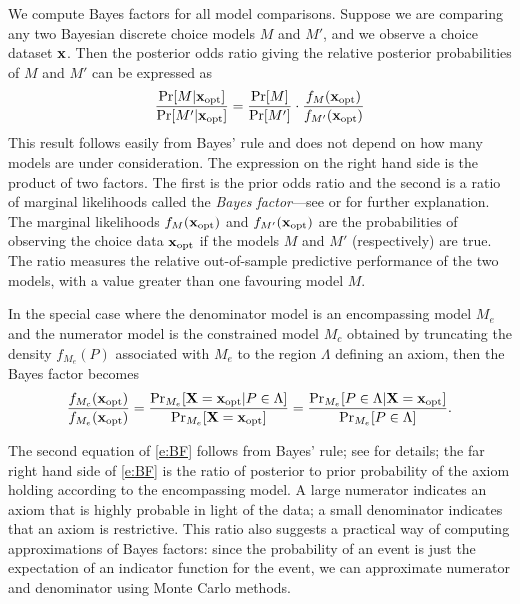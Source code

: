 \documentclass[11pt,letter]{article}
\begin{document}
We compute Bayes factors for all model comparisons.
Suppose we are comparing any two Bayesian discrete choice models $M$ and $M'$, and we observe a choice dataset ${\bf x}$.
Then the posterior odds ratio giving the relative posterior probabilities of $M$ and $M'$ can be expressed as
\[
  \frac{\Pr[M|{\bf x}_\mathrm{opt}]}{\Pr[M'|{\bf x}_\mathrm{opt}]} = \frac{\Pr[M]}{\Pr[M']}
  \cdot
  \frac{f_{M}({\bf x}_\mathrm{opt})}{f_{M'}({\bf x}_\mathrm{opt})}
\]
This result follows easily from Bayes' rule and does not depend on how many models are under consideration.
The expression on the right hand side is the product of two factors.
The first is the prior odds ratio and the second is a ratio of marginal likelihoods called the {\em Bayes factor}---see  or  for further explanation.
The marginal likelihoods $f_{M}({\bf x}_\mathrm{opt})$ and $f_{M'}({\bf x}_\mathrm{opt})$ are the probabilities of observing the choice data ${\bf x}_\mathrm{opt}$ if the models $M$ and $M'$ (respectively) are true.
The ratio measures the relative out-of-sample predictive performance of the two models, with a value greater t{}han one favouring model $M$.

In the special case where the denominator model is an encompassing model $M_e$ and the numerator model is the constrained model $M_c$ obtained by truncating the density $f_{M_e}(P)$ associated with $M_e$ to the region $\Lambda$ defining an axiom, then the Bayes factor becomes
\begin{equation}\label{e:BF}
  \frac{f_{M_c}({\bf x}_\mathrm{opt})}{f_{M_e}({\bf x}_\mathrm{opt})} =
  \frac{\Pr_{M_e}[{\bf X} = {\bf x}_\mathrm{opt}|P \in \Lambda]}{\Pr_{M_e}[{\bf X} = {\bf x}_\mathrm{opt}]} = \frac{\Pr_{M_e}[P \in \Lambda|{\bf X} = {\bf x}_\mathrm{opt}]}{\Pr_{M_e}[P \in \Lambda]}.
\end{equation}

The second equation of \eqref{e:BF} follows from Bayes' rule; see  for details; the far right hand side of \eqref{e:BF} is the ratio of posterior to prior probability of the axiom holding according to the encompassing model.{}
A large numerator indicates an axiom that is highly probable in light of the data; a small denominator indicates that an axiom is restrictive.
This ratio also suggests a practical way of computing approximations of Bayes factors: since the probability of an event is just the expectation of an indicator function for the event, we can approximate numerator and denominator using Monte Carlo methods.
\end{document}
